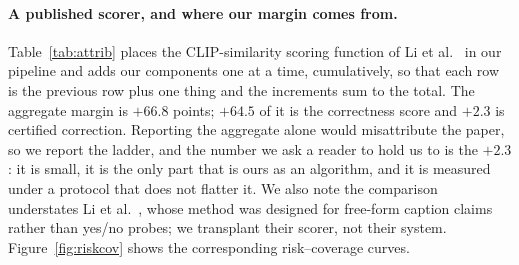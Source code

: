 \documentclass[review,number,doubleblind]{elsarticle}
\theoremstyle{plain}
\theoremstyle{definition}
\theoremstyle{remark}
\begin{document}
\paragraph{A published scorer, and where our margin comes from.}
Table~\ref{tab:attrib} places the CLIP-similarity scoring function of Li et al.~\cite{conflvlm} in our
pipeline and adds our components one at a time, cumulatively, so that each row is the previous
row plus one thing and the increments sum to the total. The aggregate margin is $+66.8$ points;
$+64.5$ of it is the correctness score and $+2.3$ is certified correction. Reporting the
aggregate alone would misattribute the paper, so we report the ladder, and the number we ask a
reader to hold us to is the $+2.3$: it is small, it is the only part that is ours as an
algorithm, and it is measured under a protocol that does not flatter it. We also note the
comparison understates
Li et al.~\cite{conflvlm}, whose method was designed for free-form caption claims rather than yes/no
probes; we transplant their scorer, not their system.
Figure~\ref{fig:riskcov} shows the corresponding risk--coverage curves.
\end{document}
